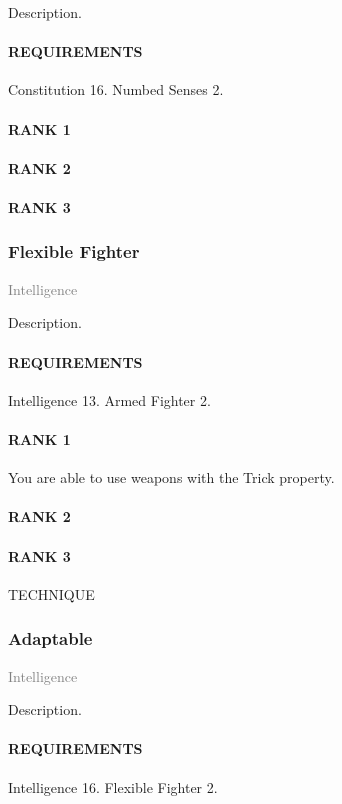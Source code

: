 \normalsize
Description.
\paragraph{REQUIREMENTS} Constitution 16. Numbed Senses 2.
\paragraph{RANK 1} 
\paragraph{RANK 2} 
\paragraph{RANK 3} 

\subsubsection{Flexible Fighter} \label{tal::flexiblefighter} %
\small{\textcolor{gray}{Intelligence}}

\normalsize
Description.
\paragraph{REQUIREMENTS} Intelligence 13. Armed Fighter 2.
\paragraph{RANK 1} You are able to use weapons with the Trick property.
\paragraph{RANK 2} 
\paragraph{RANK 3} TECHNIQUE

\subsubsection{Adaptable} \label{tal::adaptable} %
\small{\textcolor{gray}{Intelligence}}

\normalsize
Description.
\paragraph{REQUIREMENTS} Intelligence 16. Flexible Fighter 2.

